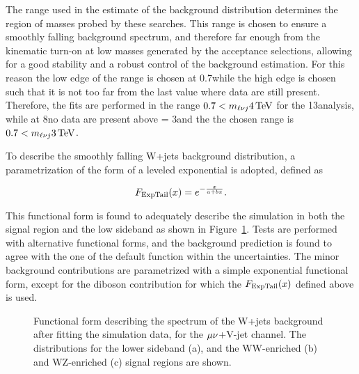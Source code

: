 The \mlvj range used in the estimate of the background distribution determines the region of masses probed by these searches.
This range is chosen to ensure a smoothly falling background spectrum, and therefore far enough from the kinematic turn-on at low masses generated by the acceptance selections,
allowing for a good stability and a robust control of the background estimation.
For this reason the low edge of the range is chosen at 0.7\TeV while the high edge is chosen such that it is not too far from the last value where data are still present.
Therefore, the fits are performed in the range $0.7 < m_{\ell\nu j} 4\,\text{Te\hspace{-.08em}V}$ for the 13\TeV analysis, while at 8\TeV no data are present above \mlvj = 3\TeV and the the chosen range is $0.7 < m_{\ell\nu j} 3\,\text{Te\hspace{-.08em}V}$.

To describe the smoothly falling W+jets background distribution, a parametrization of the form of a leveled exponential is adopted, defined as

\begin{equation}\label{eqn:mVVfunct}
   F_{\rm ExpTail}(x) = e^{-\frac{x}{a+bx}}.
\end{equation}

This functional form is found to adequately describe the simulation in both the signal region and the low sideband as shown in Figure~\ref{fig:mcfits_mlvj}. Tests are performed with alternative functional forms, and the background prediction is found to agree with the one of the default function within the uncertainties.
The minor background contributions are parametrized with a simple exponential functional form, except for the diboson contribution for which the $F_{\rm ExpTail}(x)$ defined above is used.

\begin{figure}[!htb]
\centering
{}
\caption{Functional form describing the \mWV spectrum of the W+jets background after fitting the simulation data, for the $\mu\nu$+V-jet channel. The distributions for the lower \mJ sideband (a), and the WW-enriched (b) and WZ-enriched (c) signal regions are shown.}
\label{fig:mcfits_mlvj}
\end{figure}

